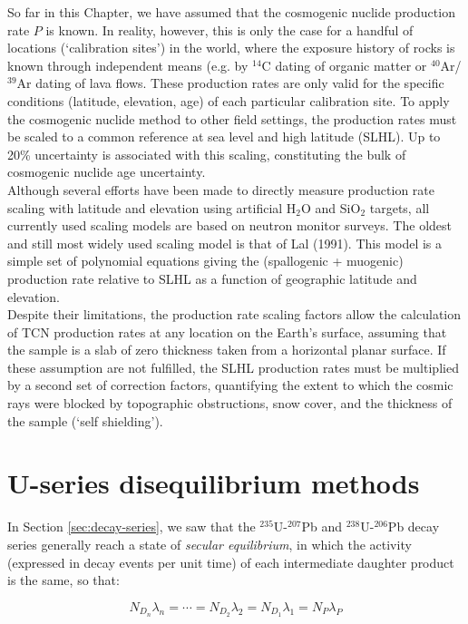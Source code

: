 \documentclass{book}
\begin{document}
So far in this Chapter, we have assumed that the cosmogenic nuclide
production rate $P$ is known. In reality, however, this is only the
case for a handful of locations (`calibration sites') in the world,
where the exposure history of rocks is known through independent means
(e.g. by $^{14}$C dating of organic matter or $^{40}$Ar/$^{39}$Ar
dating of lava flows. These production rates are only valid for the
specific conditions (latitude, elevation, age) of each particular
calibration site. To apply the cosmogenic nuclide method to other
field settings, the production rates must be scaled to a common
reference at sea level and high latitude (SLHL). Up to 20\%
uncertainty is associated with this scaling, constituting the bulk of
cosmogenic nuclide age uncertainty.\\

Although several efforts have been made to directly measure production
rate scaling with latitude and elevation using artificial H$_{2}$O and
SiO$_2$ targets, all currently used scaling models are based on
neutron monitor surveys. The oldest and still most widely used scaling
model is that of Lal (1991). This model is a simple set of polynomial
equations giving the (spallogenic + muogenic) production rate relative
to SLHL as a function of geographic latitude and elevation.\\

Despite their limitations, the production rate scaling factors allow
the calculation of TCN production rates at any location on the Earth’s
surface, assuming that the sample is a slab of zero thickness taken
from a horizontal planar surface. If these assumption are not
fulfilled, the SLHL production rates must be multiplied by a second
set of correction factors, quantifying the extent to which the cosmic
rays were blocked by topographic obstructions, snow cover, and the
thickness of the sample (`self shielding').

\chapter[U-series dating]{U-series disequilibrium methods}
\label{sec:U-series}

In Section \ref{sec:decay-series}, we saw that the
$^{235}$U-$^{207}$Pb and $^{238}$U-$^{206}$Pb decay series generally
reach a state of \emph{secular equilibrium}, in which the activity
(expressed in decay events per unit time) of each intermediate
daughter product is the same, so that:

$$N_{D_n} \lambda_n = \cdots  = N_{D_2} \lambda_2 = N_{D_1} \lambda_1 = N_{P} \lambda_P$$
\end{document}
